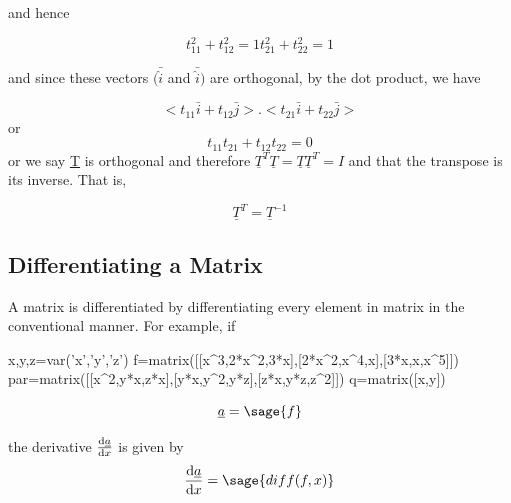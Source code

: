 \documentclass[12pt]{report}
\begin{document}
and hence

\begin{equation}
	{t}^2_{11} + {t}^2_{12}=1 
	{t}^2_{21} + {t}^2_{22}=1
\end{equation}

and since these vectors $(\bar{\hat{i}}$ and $\bar{\hat{i}})$ are
orthogonal, by the dot product, we have


\begin{equation}
	<{t}_{11} \bar{i} + {t}_{12} \bar{j}>.<{t}_{21} \bar{i} +
	{t}_{22} \bar{j}>
\end{equation}
or 
\begin{equation}
		{t}_{11}{t}_{21} + {t}_{12} {t}_{22}=0
\end{equation}
or we say \underline{T} is orthogonal and 
therefore $\underline{T}^T\underline{T}=\underline{T}\underline{T}^T=I$ 
and that the transpose is its inverse. That is,

\begin{equation}
	\underline{T}^T=\underline{T}^{-1}
\end{equation}


\subsection{Differentiating a Matrix}

A matrix is differentiated by differentiating
 every element in matrix in the conventional 
manner. For example, if

\begin{sagesilent}
	x,y,z=var('x','y','z')
	f=matrix([[x^3,2*x^2,3*x],[2*x^2,x^4,x],[3*x,x,x^5]])
	par=matrix([[x^2,y*x,z*x],[y*x,y^2,y*z],[z*x,y*z,z^2]])
	q=matrix([x,y])
\end{sagesilent}

\begin{equation}
	\underline{a}= \sage{f}
\end{equation}

the derivative $\frac{{\rm d}\underline{a}}{{\rm d}x}$ 
is given by 
\begin{equation} 
	\frac{{\rm d}\underline{a}}{{\rm d}x} = \sage{diff(f,x)}
\end{equation}
\end{document}
